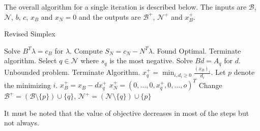 \documentclass[12pt,letterpaper]{article}
\begin{document}
\nocite{*}

The overall algorithm for a single iteration is described below. The inputs are $\mathcal{B}$, $\mathcal{N}$, $b$, $c$, $x_B$ and $x_N=0$ and the outputs are $\mathcal{B^+}$, $\mathcal{N^+}$ and $x^+_B$.

\begin{algorithm}[H]
	\caption{Revised Simplex}
	\begin{algorithmic}[1]		
		\State Solve $B^T\lambda = c_B$ for $\lambda$.
		\State Compute $S_N = c_N - N^T\lambda $.		
			\State Found Optimal. Terminate algorithm.
		\Else
			\State Select $q \in \mathcal{N}$ where $s_q$ is the most negative.
			\State Solve $Bd = A_q$ for $d$.
				\State Unbounded problem. Terminate Algorithm.
			\Else
				\State $x^+_q = \min_{i, d_i \ge 0} \frac{(x_B)_i}{d_i}$. Let $p$ denote the minimizing $i$.  
				\State $x^+_B = x_B - dx^+_q$
				\State $x^+_N = (0,\dots,0,x^+_q,0,\dots,o)^T$
				\State Change $\mathcal{B^+} = (\mathcal{B} \setminus \{p\}) \cup \{q\} $, $\mathcal{N^+} = (\mathcal{N} \setminus \{q\}) \cup \{p\} $
			\EndIf
		\EndIf
		\EndFunction
		
	\end{algorithmic}
\end{algorithm}

It must be noted that the value of objective decreases in most of the steps but not always.

\printbibliography
\end{document}
